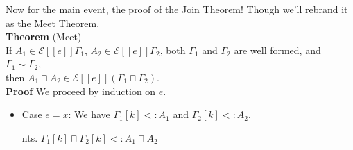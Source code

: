 \documentclass{article}
\newcommand{\SEM}[1]{[\![ #1 ]\!]}
\newcommand{\ESEM}[1]{\mathcal{E}\SEM{#1}}
\begin{document}
Now for the main event, the proof of the Join Theorem!
Though we'll rebrand it as the Meet Theorem.\\

\noindent \textbf{Theorem} (Meet)\\
If $A_1 \in \ESEM{e}\Gamma_1$, $A_2 \in \ESEM{e}\Gamma_2$,
both $\Gamma_1$ and $\Gamma_2$ are well formed,
and $\Gamma_1 \sim \Gamma_2$, \\
then $A_1 \sqcap A_2 \in \ESEM{e}(\Gamma_1\sqcap\Gamma_2)$. \\
%
\textbf{Proof}
We proceed by induction on $e$.
\begin{itemize}
\item Case $e=x$:
  We have $\Gamma_1[k] <: A_1$ and $\Gamma_2[k] <: A_2$.

  nts. $\Gamma_1[k] \sqcap \Gamma_2[k] <: A_1 \sqcap A_2$
\end{itemize}
\end{document}
